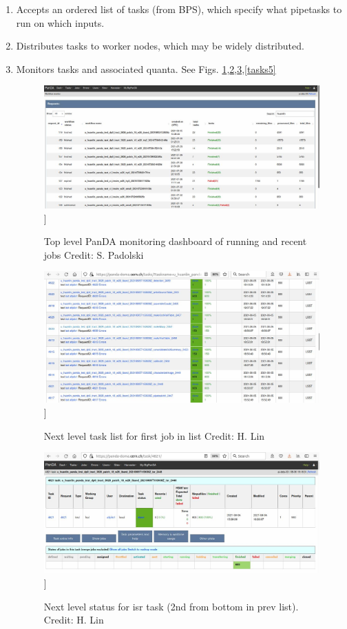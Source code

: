 \documentclass[DM,authoryear,toc]{lsstdoc}
\begin{document}
\begin{enumerate}

\item Accepts an ordered list of tasks (from BPS), which specify what
pipetasks to run on which inputs.

\item Distributes tasks to worker nodes, which may be widely distributed.

\item Monitors tasks and associated quanta. 
See Figs. \ref{pandadash0},\ref{tasks1},\ref{tasks4},\ref{tasks5}

\begin{figure}
\includegraphics[width=\textwidth]{pandadash0.jpg}]
\caption{Top level PanDA monitoring dashboard of running and recent jobs
Credit: S. Padolski}
\label{pandadash0}
\end{figure}

\begin{figure}
\includegraphics[width=\textwidth]{tasks1.jpg}]
\caption{Next level task list for first job in list
Credit: H. Lin}
\label{tasks1}
\end{figure}

\begin{figure}
\includegraphics[width=\textwidth]{tasks4.jpg}]
\caption{Next level status for isr task (2nd from bottom in prev list).
Credit: H. Lin}
\label{tasks4}
\end{figure}


\end{enumerate}
\end{document}
